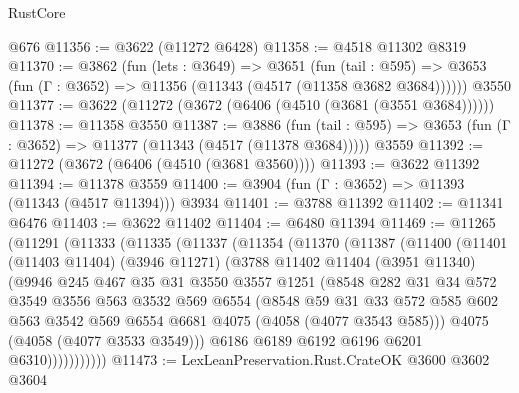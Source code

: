 \begin{lexlean}{RustCore}
\begin{coremodule}
    @676
@11356 := @3622 (@11272 @6428)
@11358 := @4518 @11302 @8319
@11370 := @3862
    (fun (lets : @3649) =>
    @3651
      (fun (tail : @595) =>
      @3653 (fun (Γ : @3652) => @11356 (@11343 (@4517 (@11358 @3682 @3684))))))
    @3550
@11377 := @3622 (@11272 (@3672 (@6406 (@4510 (@3681 (@3551 @3684))))))
@11378 := @11358 @3550
@11387 := @3886
    (fun (tail : @595) => @3653 (fun (Γ : @3652) => @11377 (@11343 (@4517 (@11378 @3684)))))
    @3559
@11392 := @11272 (@3672 (@6406 (@4510 (@3681 @3560))))
@11393 := @3622 @11392
@11394 := @11378 @3559
@11400 := @3904 (fun (Γ : @3652) => @11393 (@11343 (@4517 @11394))) @3934
@11401 := @3788 @11392
@11402 := @11341 @6476
@11403 := @3622 @11402
@11404 := @6480 @11394
@11469 := @11265
    (@11291
      (@11333
        (@11335
          (@11337
            (@11354
              (@11370
                (@11387
                  (@11400
                    (@11401
                      (@11403 @11404)
                      (@3946 @11271)
                      (@3788
                        @11402
                        @11404
                        (@3951 @11340)
                        (@9946
                          @245
                          @467
                          @35
                          @31
                          @3550
                          @3557
                          @1251
                          (@8548
                            @282
                            @31
                            @34
                            @572
                            @3549
                            @3556
                            @563
                            @3532
                            @569
                            @6554
                            (@8548
                              @59
                              @31
                              @33
                              @572
                              @585
                              @602
                              @563
                              @3542
                              @569
                              @6554
                              @6681
                              @4075
                              (@4058 (@4077 @3543 @585)))
                            @4075
                            (@4058 (@4077 @3533 @3549)))
                          @6186
                          @6189
                          @6192
                          @6196
                          @6201
                          @6310)))))))))))
@11473 := LexLeanPreservation.Rust.CrateOK @3600 @3602 @3604

\end{coremodule}
\end{lexlean}
